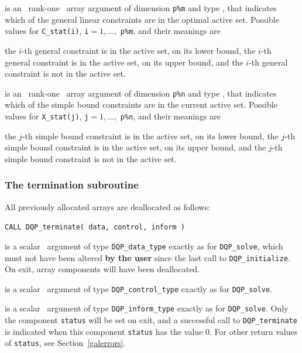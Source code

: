 \documentclass{galahad}
\newcommand{\packagename}{DQP}
\begin{document}
\begin{description}
 is an \optional\ rank-one \intentout\ array argument of
dimension {\tt p\%m}
and type \integer, that indicates which of the general linear
constraints are in the optimal active set. Possible values for
{\tt C\_stat(i)}, {\tt i}$=1, \ldots ,$ {\tt p\%m}, and their meanings are
\begin{description}
 the $i$-th general constraint
is in the active set, on its lower bound,
 the $i$-th general constraint
is in the active set, on its upper bound, and
  the $i$-th general constraint is not in the active set.
\end{description}

 is an \optional\ rank-one \intentout\ array argument of
dimension {\tt p\%n}
and type \integer, that indicates which of the simple bound
constraints are in the current active set. Possible values for
{\tt X\_stat(j)}, {\tt j}$=1, \ldots ,$ {\tt p\%n}, and their meanings are
\begin{description}
 the $j$-th simple bound constraint
is in the active set, on its lower bound,
 the $j$-th simple bound constraint
is in the active set, on its upper bound, and
  the $j$-th simple bound constraint is not in the active set.
\end{description}

\end{description}


\subsubsection{The  termination subroutine}
All previously allocated arrays are deallocated as follows:
\vspace*{1mm}

\hspace{8mm}
{\tt CALL \packagename\_terminate( data, control, inform )}

\vspace*{-3mm}
\begin{description}

 is a scalar \intentinout\ argument of type
{\tt \packagename\_data\_type}
exactly as for
{\tt \packagename\_solve},
which must not have been altered {\bf by the user} since the last call to
{\tt \packagename\_initialize}.
On exit, array components will have been deallocated.

 is a scalar \intentin\ argument of type
{\tt \packagename\_control\_type}
exactly as for
{\tt \packagename\_solve}.

 is a scalar \intentout\ argument of type
{\tt \packagename\_inform\_type}
exactly as for
{\tt \packagename\_solve}.
Only the component {\tt status} will be set on exit, and a
successful call to
{\tt \packagename\_terminate}
is indicated when this  component {\tt status} has the value 0.
For other return values of {\tt status}, see Section~\ref{galerrors}.

\end{description}
\end{document}
